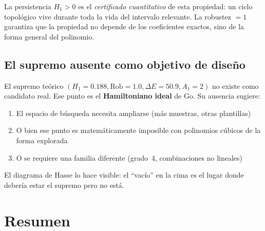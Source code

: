 \documentclass[11pt, a4paper]{article}
\begin{document}
La persistencia $H_1>0$ es el \emph{certificado cuantitativo} de esta
propiedad: un ciclo topol\'ogico vive durante toda la vida
del intervalo relevante. La robustez $=1$ garantiza que la propiedad
no depende de los coeficientes exactos, sino de la forma general del polinomio.

\subsection{El supremo ausente como objetivo de dise\~no}

El supremo te\'orico $(H_1=0.188, \mathrm{Rob}=1.0, \Delta E=50.9, A_1=2)$
no existe como candidato real. Ese punto es el \textbf{Hamiltoniano ideal}
de Go. Su ausencia sugiere:

\begin{enumerate}
  \item El espacio de b\'usqueda necesita ampliarse (m\'as muestras,
        otras plantillas)
  \item O bien ese punto es matem\'aticamente imposible con polinomios
        c\'ubicos de la forma explorada
  \item O se requiere una familia diferente (grado~4, combinaciones no
        lineales)
\end{enumerate}

El diagrama de Hasse lo hace visible: el ``vac\'io'' en la cima es el lugar
donde deber\'ia estar el supremo pero no est\'a.

\section{Resumen}
\end{document}
